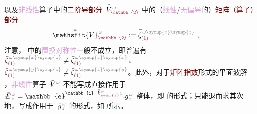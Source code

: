 以及\textcolor{Plum}{非线性}算子中的\textcolor{Maroon}{二阶导部分} $\Xint{\mathcolor{gray}{-}}{21}{\bar{\bar{V}}}^{\;\! \mathcolor{gray}{\omega}}_{\textcolor{Maroon}{\mathbb{2}}}$ 中的（\textcolor{Plum}{线性}/\textcolor{Plum}{无偏导}的）\textcolor{Maroon}{矩阵（算子）部分}
\begin{align} \label{eq:matrix_exp-V2}
	\Xint{\mathcolor{gray}{-}}{25}{\bar{\bar{\mathsfit{V}}}}^{\;\! \mathcolor{gray}{\omega}}_{\textcolor{Maroon}{\mathbb{2}}} := \bar{\bar{\zeta}}^{\;\! \mathcolor{gray}{\omega} \mathcolor{gray}{\symup{z} \symup{z}}}_{\textcolor{Maroon}{(1)}} ~, 
\end{align}
注意， 中的\textcolor{Plum}{置换对称性}一般不成立，即普遍有 $\bar{\bar{\zeta}}^{\;\! \mathcolor{gray}{\omega} \mathcolor{gray}{\symup{x} \symup{z}}}_{\textcolor{Maroon}{(1)}} \neq \bar{\bar{\zeta}}^{\;\! \mathcolor{gray}{\omega} \mathcolor{gray}{\symup{z} \symup{x}}}_{\textcolor{Maroon}{(1)}}$、 $\bar{\bar{\zeta}}^{\;\! \mathcolor{gray}{\omega} \mathcolor{gray}{\symup{y} \symup{z}}}_{\textcolor{Maroon}{(1)}} \neq \bar{\bar{\zeta}}^{\;\! \mathcolor{gray}{\omega} \mathcolor{gray}{\symup{z} \symup{y}}}_{\textcolor{Maroon}{(1)}}$。此外，对于\textcolor{Maroon}{矩阵指数}形式的平面波解 ，\textcolor{Plum}{非线性}算子 $\Xint{\mathcolor{gray}{-}}{21}{\bar{\bar{V}}}^{\;\! \mathcolor{gray}{\omega}}$ 不能写成直接作用于 $\Xint{\mathcolor{gray}{-}}{25}{\bar{E}}^{\;\!\mathcolor{gray}{\omega}}_{\;\! \mathcolor{gray}{z}} = \mathbb{e}^{\mathbb{i} \Xint{\begin{smallmatrix} ~ \\ {}^{}_{\mathcolor{gray}{-}} \\ ~ \end{smallmatrix}}{15}{\bar{\bar{k}}}_{\textcolor{Maroon}{\symup{z}}}^{\;\! \mathcolor{gray}{\omega}} \mathcolor{gray}{z}} \Xint{{}^{}_{\mathcolor{gray}{-}}}{10}{\bar{g}}^{\;\!\mathcolor{gray}{\omega}}_{\;\! \mathcolor{gray}{z}}$ 整体，即  的形式；只能退而求其次地，写成作用于 $\Xint{{}^{}_{\mathcolor{gray}{-}}}{10}{\bar{g}}^{\;\!\mathcolor{gray}{\omega}}_{\;\! \mathcolor{gray}{z}}$ 的形式，如  所示。

